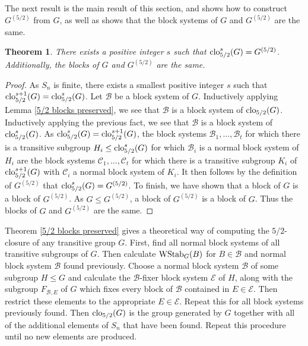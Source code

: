 \documentclass{amsart}
\newtheorem{thrm}{Theorem}[section]
\theoremstyle{definition}
\theoremstyle{remark}
\numberwithin{equation}{section}
\def\cal{\mathcal}
\def\clo{{\rm clo}}
\def\WStab{{\rm WStab}}
\begin{document}
The next result is the main result of this section, and shows how to construct $G^{(5/2)}$ from $G$, as well as shows that the block systems of $G$ and $G^{(5/2)}$ are the same.

\begin{thrm}\label{compute G^5/2}
There exists a positive integer $s$ such that $\clo_{5/2}^s(G) = G^{(5/2)}$.  Additionally, the blocks of $G$ and $G^{(5/2)}$ are the same.
\end{thrm}

\begin{proof}
As $S_n$ is finite, there exists a smallest positive integer $s$ such that $\clo^{s+1}_{5/2}(G) = \clo^s_{5/2}(G)$.
Let ${\cal B}$ be a block system of $G$.  Inductively applying Lemma \ref{5/2 blocks preserved}, we see that ${\cal B}$ is a block system of $\clo_{5/2}(G)$.  Inductively applying the previous fact, we see that ${\cal B}$ is a block system of $\clo^s_{5/2}(G)$.  As $\clo_{5/2}^s(G) = \clo_{5/2}^{s+1}(G)$, the block systems ${\cal B}_1,\ldots,{\cal B}_t$ for which there is a transitive subgroup $H_i\le\clo_{5/2}^s(G)$ for which ${\cal B}_i$ is a normal block system of $H_i$ are the block systems ${\cal C}_1,\ldots,{\cal C}_t$ for which there is a transitive subgroup $K_i$ of $\clo_{5/2}^{s+1}(G)$ with ${\cal C}_i$ a normal block system of $K_i$.  It then follows by the definition of $G^{(5/2)}$ that $\clo_{5/2}^s(G) = G^{(5/2)}$.  To finish, we have shown that a block of $G$ is a block of $G^{(5/2)}$.  As $G\le G^{(5/2)}$, a block of $G^{(5/2)}$ is a block of $G$.  Thus the blocks of $G$ and $G^{(5/2)}$ are the same.
\end{proof}

Theorem  \ref{5/2 blocks preserved} gives a theoretical way of computing the $5/2$-closure of any transitive group $G$.  First, find all normal block systems of all transitive subgroups of $G$.  Then calculate $\WStab_G(B)$ for $B\in{\cal B}$ and normal block system ${\cal B}$ found previously. Choose a normal block system ${\cal B}$ of some subgroup $H\le G$ and calculate the ${\cal B}$-fixer block system ${\cal E}$ of $H$, along with the subgroup $F_{{\cal B},E}$ of $G$ which fixes every block of ${\cal B}$ contained in $E\in{\cal E}$.  Then restrict these elements to the appropriate $E\in{\cal E}$.  Repeat this for all block systems previously found.  Then $\clo_{5/2}(G)$ is the group generated by $G$ together with all of the additional elements of $S_n$ that have been found.  Repeat this procedure until no new elements are produced.
\end{document}
